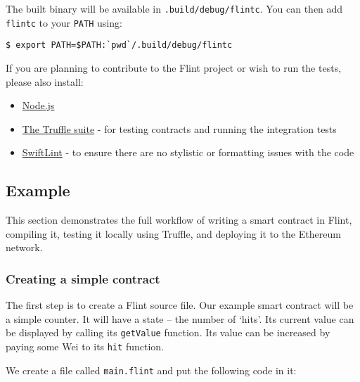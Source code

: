 The built binary will be available in \texttt{.build/debug/flintc}. You can then add \texttt{flintc} to your \texttt{PATH} using:

\begin{verbatim}
$ export PATH=$PATH:`pwd`/.build/debug/flintc
\end{verbatim}

If you are planning to contribute to the Flint project or wish to run the tests, please also install:

\begin{itemize}
	\item \href{https://nodejs.org/en/}{Node.js}
	\item \href{https://truffleframework.com}{The Truffle suite} - for testing contracts and running the integration tests
	\item \href{https://github.com/realm/SwiftLint}{SwiftLint} - to ensure there are no stylistic or formatting issues with the code
\end{itemize}

\subsection{Example}
\label{sec:appendix-b-example}

This section demonstrates the full workflow of writing a smart contract in Flint, compiling it, testing it locally using Truffle, and deploying it to the Ethereum network.

\subsubsection{Creating a simple contract}
\label{sec:appendix-b-creating-a-simple-contract}

The first step is to create a Flint source file. Our example smart contract will be a simple counter. It will have a state – the number of `hits'. Its current value can be displayed by calling its \texttt{getValue} function. Its value can be increased by paying some Wei to its \texttt{hit} function.

We create a file called \texttt{main.flint} and put the following code in it:

